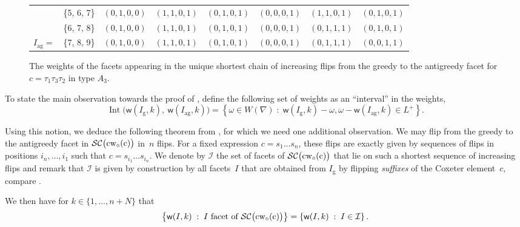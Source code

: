 \documentclass[ALCO,Unicode,ThmDefs]{cedram}
\newcommand{\subwordComplex}{\mathcal{SC}}
\newcommand{\clusterComplex}{\subwordComplex\big(\cw{c}\big)}
\newcommand{\greedy}{I_{\operatorname{g}}}
\newcommand{\antigreedy}{I_{\operatorname{ag}}}
\newcommand{\sq}[1]{{\rm #1}}
\newcommand{\sfw}{\mathsf{w}}
\newcommand{\wo}{{w_\circ}}
\newcommand{\sw}[2]{\sq{#1}(\sq{#2})}
\newcommand{\cwo}[1]{\sw{\wo}{#1}}
\newcommand{\cw}[1]{\sq{#1}\cwo{#1}}
\newcommand{\Weight}[2]{{\sfw}(#1,#2)}
\newcommand{\IntervalWeight}[1]{{\operatorname{Int}\big(\Weight{\greedy}{#1},\ \Weight{\antigreedy}{#1}\big)}}
\newcommand{\set}[2]{\left\{ #1 \;:\; #2 \right\}}
\begin{document}
\begin{exem}
\begin{figure}[t]
{\begin{tabular}{|cc||c|c|c|c|c|c|}
& \{5, 6, 7\} & $(0, 1, 0, 0)$ & $(1, 1, 0, 1)$ & $(0, 1, 0, 1)$ & $(0, 0, 0, 1)$ & $(1, 1, 0, 1)$ & $(0, 1, 0, 1)$ \\
& \{6, 7, 8\} & $(0, 1, 0, 0)$ & $(1, 1, 0, 1)$ & $(0, 1, 0, 1)$ & $(0, 0, 0, 1)$ & $(0, 1, 1, 1)$ & $(0, 1, 0, 1)$ \\
\rowcolor{lightgrey} $\antigreedy=$\hspace*{-5pt} & \{7, 8, 9\} & $(0, 1, 0, 0)$ & $(1, 1, 0, 1)$ & $(0, 1, 0, 1)$ & $(0, 0, 0, 1)$ & $(0, 1, 1, 1)$ & $(0, 0, 1, 1)$ \\
\hline
\end{tabular} }
\caption{\label{weightsc132A3}
The weights of the facets appearing in the unique shortest chain of increasing flips from the greedy to the antigreedy facet for $c=\tau_1\tau_3\tau_2$ in type $A_3$.}
\end{figure}
\end{exem}

To state the main observation towards the proof of , define the following set of weights as an ``interval'' in the weights,
\[
\IntervalWeight{k} = \set{\omega \in W(\nabla)}{\Weight{\greedy}{k} - \omega, \omega - \Weight{\antigreedy}{k} \in L^+}.
\]

Using this notion, we deduce the following theorem from , for which we need one additional observation. We may flip from the greedy to the antigreedy facet in $\clusterComplex$ in~$n$ flips. For a fixed expression $c = s_1\dots s_n$, these flips are exactly given by sequences of flips in positions $i_n,\dots,i_1$ such that $c = s_{i_1}\dots s_{i_n}$. We denote by $\mathcal{I}$ the set of facets of $\clusterComplex$ that lie on such a shortest sequence of increasing flips and remark that $\mathcal{I}$ is given by construction by all facets~$I$ that are obtained from $\greedy$ by flipping \emph{suffixes} of the Coxeter element~$c$, compare .

\begin{theo}\label{cor:intervalequality}
We then have for $k \in \{1,\dots,n+N\}$ that
\begin{equation*}
\set{\Weight{I}{k}}{I \text{ facet of }\clusterComplex} = \set{\Weight{I}{k}}{I \in \mathcal{I}}.
\end{equation*}
\end{theo}
\end{document}
